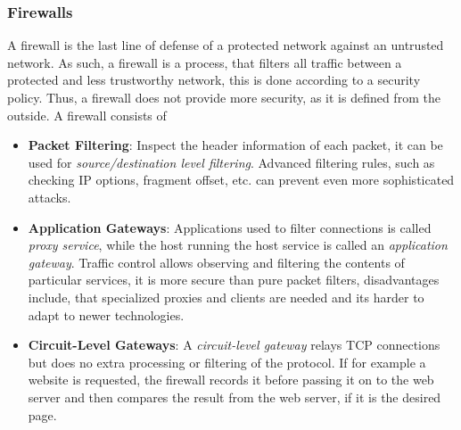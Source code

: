 \documentclass[a4paper, 10 pt, conference]{ieeeconf}
\begin{document}
\subsubsection{\textbf{Firewalls}}
\label{firewall}
A firewall is the last line of defense of a protected network against an untrusted network. As such, a firewall is a process, that filters all traffic between a protected and less trustworthy network, this is done according to a security policy. 
Thus, a firewall does not provide more security, as it is defined from the outside. A firewall consists of
\begin{itemize}
\item \textbf{Packet Filtering}: Inspect the header information of each packet, it can be used for \emph{source/destination level filtering}. Advanced filtering rules, such as checking IP options, fragment offset, etc. can prevent even more sophisticated attacks. 
\item \textbf{Application Gateways}: Applications used to filter connections is called \emph{proxy service}, while the host running the host service is called an \emph{application gateway}. Traffic control allows observing and filtering the contents of particular services, it is more secure than pure packet filters, disadvantages include, that specialized proxies and clients are needed and its harder to adapt to newer technologies.
\item \textbf{Circuit-Level Gateways}: A \emph{circuit-level gateway} relays TCP connections but does no extra processing or filtering of the protocol. If for example a website is requested, the firewall records it before passing it on to the web server and then compares the result from the web server, if it is the desired page. 
\end{itemize} 

\vspace{0.5cm}
\end{document}
